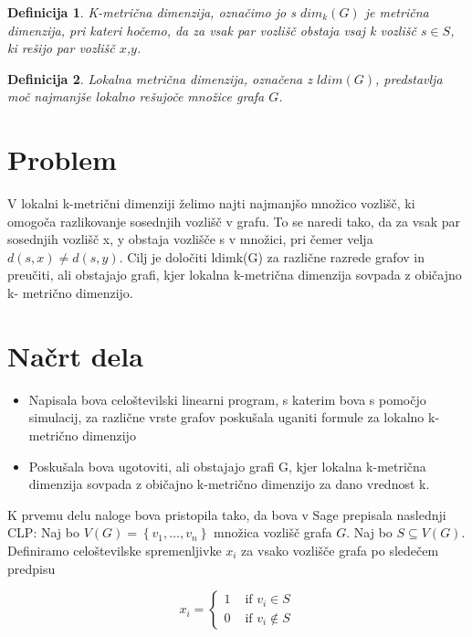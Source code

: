 \documentclass[a4paper,12pt]{article}
\newtheorem{definition}{Definicija}
\begin{document}
    \begin{definition}
        K-metrična dimenzija, označimo jo s $dim_k(G)$ je metrična dimenzija, 
        pri kateri hočemo, da za vsak par vozlišč obstaja vsaj k vozlišč $s \in S$, ki rešijo par vozlišč $x$,$y$.
    \end{definition}   
    
    \begin{definition}
        Lokalna metrična dimenzija, označena z $ldim(G)$, predstavlja moč najmanjše 
        lokalno rešujoče množice grafa $G$.
    \end{definition} 

\section{Problem} 
V lokalni k-metrični dimenziji želimo najti najmanjšo množico vozlišč, ki omogoča razlikovanje sosednjih 
vozlišč v grafu. To se naredi tako, da za vsak par sosednjih vozlišč x, y obstaja vozlišče s v množici, 
pri čemer velja $d(s, x) \neq d(s, y)$. Cilj je določiti ldimk(G) za različne razrede grafov in preučiti, 
ali obstajajo grafi, kjer lokalna k-metrična dimenzija sovpada z običajno k- metrično dimenzijo.    


\section{Načrt dela}
    \begin{itemize}
        \item Napisala bova celoštevilski linearni program, s katerim bova s pomočjo simulacij, 
        za različne vrste grafov poskušala uganiti formule za lokalno k-metrično dimenzijo
        \item Poskušala bova ugotoviti, ali obstajajo grafi G, kjer lokalna k-metrična dimenzija sovpada z 
        običajno k-metrično dimenzijo za dano vrednost k.
    \end{itemize}

    K prvemu delu naloge bova pristopila tako, da bova v Sage prepisala naslednji CLP:
    Naj bo $V(G)=\left\{v_{1}, \ldots, v_{n}\right\}$ množica vozlišč grafa $G$. 
    Naj bo $S \subseteq V(G)$. 
    Definiramo celoštevilske spremenljivke $x_{i}$ za vsako vozlišče grafa po sledečem predpisu 
    
    $$
    x_{i}= \begin{cases}1 & \text { if } v_{i} \in S \\ 0 & \text { if } v_{i} \notin S\end{cases}
    $$
    
\end{document}
